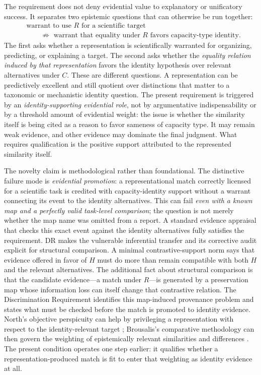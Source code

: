 \documentclass[11pt]{article}
\begin{document}
The requirement does not deny evidential value to explanatory or unificatory success. It separates two epistemic questions that can otherwise be run together:
\[
\begin{aligned}
&\text{warrant to use }R\text{ for a scientific target}\\
&\qquad\not\Rightarrow
\text{ warrant that equality under }R\text{ favors capacity-type identity}.
\end{aligned}
\]
The first asks whether a representation is scientifically warranted for organizing, predicting, or explaining a target. The second asks whether the \emph{equality relation induced by that representation} favors the identity hypothesis over relevant alternatives under \(C\). These are different questions. A representation can be predictively excellent and still quotient over distinctions that matter to a taxonomic or mechanistic identity question. The present requirement is triggered by an \emph{identity-supporting evidential role}, not by argumentative indispensability or by a threshold amount of evidential weight: the issue is whether the similarity itself is being cited as a reason to favor sameness of capacity type. It may remain weak evidence, and other evidence may dominate the final judgment. What requires qualification is the positive support attributed to the represented similarity itself.

The novelty claim is methodological rather than foundational. The distinctive failure mode is \emph{evidential promotion}: a representational match correctly licensed for a scientific task is credited with capacity-identity support without a warrant connecting its event to the identity alternatives. This can fail \emph{even with a known map and a perfectly valid task-level comparison}; the question is not merely whether the map name was omitted from a report. A standard evidence appraisal that checks this exact event against the identity alternatives fully satisfies the requirement. DR makes the vulnerable inferential transfer and its corrective audit explicit for structural comparison. A minimal contrastive-support norm says that evidence offered in favor of \(H\) must do more than remain compatible with both \(H\) and the relevant alternatives. The additional fact about structural comparison is that the candidate evidence---a match under \(R\)---is generated by a preservation map whose information loss can itself change that contrastive relation. The Discrimination Requirement identifies this map-induced provenance problem and states what must be checked before the match is promoted to identity evidence. North's objective perspicuity can help by privileging a representation with respect to the identity-relevant target \citep{North2026Perspicuous}; Brousalis's comparative methodology can then govern the weighting of epistemically relevant similarities and differences \citep{Brousalis2026TheoryComparison}. The present condition operates one step earlier: it qualifies whether a representation-produced match is fit to enter that weighting as identity evidence at all.
\end{document}
